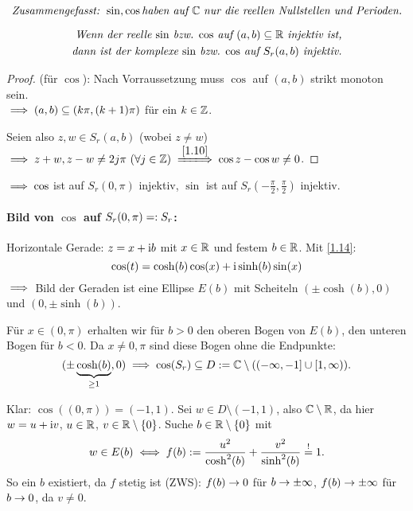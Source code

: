 \documentclass[a4paper,twoside,DIV15,BCOR12mm]{scrbook}
\begin{document}
\vspace*{-10pt}

\begin{equation}\label{1.17}
\text{\it Zusammengefasst: }\sin,\cos \text{\it haben auf }\mathbb{C}\text{ \it nur die reellen Nullstellen und Perioden.}
\end{equation}

\vspace*{-20pt}

\begin{equation}\label{1.18}
\begin{split}
\text{\it Wenn der reelle $\sin$ bzw. $\cos$ auf $(a,b)\subseteq\mathbb{R}$  injektiv ist,}\\\text{\it dann ist der komplexe $\sin$ bzw. $\cos$ auf $S_r(a,b)$ injektiv.}
\end{split}\end{equation}
\begin{proof}
(für $\cos$): Nach Vorraussetzung muss $\cos$ auf $(a,b)$ strikt monoton sein.\\ $\implies (a,b)\subseteq(k\pi,(k+1)\pi)$ für ein $k\in\mathbb{Z}$.

\noindent Seien also $z,w\in S_r(a,b)$ (wobei $z\neq w$) $\folgt z+w, z-w \neq 2j\pi\ (\forall j\in\set{Z})\\ \folgtwegen{\eqref{1.10}}\cos z - \cos w\neq 0$.
\end{proof}

$\implies\cos$ ist auf $S_r(0,\pi)$ injektiv, $\sin$ ist auf $S_r(-\frac{\pi}{2},\frac{\pi}{2})$ injektiv.

\paragraph{Bild von $\cos$ auf $S_r(0,\pi) =: S_r$:} Horizontale Gerade: $z=x+\mathrm{i} b$ mit $x\in\mathbb{R}$ und festem $b\in\mathbb{R}$. Mit \eqref{1.14}:
\[\cos(t) = \cosh(b)\cos(x)+\mathrm{i}\sinh(b)\sin(x)\]
$\implies$ Bild der Geraden ist eine Ellipse $E(b)$ mit Scheiteln $(\pm\cosh(b),0)$ und $(0,\pm\sinh(b))$.

Für $x\in(0,\pi)$ erhalten wir für $b>0$ den oberen Bogen von $E(b)$, den unteren Bogen für $b<0$. Da $x\neq 0,\pi$ sind diese Bogen ohne die Endpunkte:
\[(\pm\underbrace{\cosh(b)}_{\geq 1},0)\implies \cos(S_r)\subseteq D := \mathbb{C}\setminus((-\infty,-1]\cup[1,\infty)).\]

Klar: $\cos((0,\pi)) = (-1,1)$. Sei $w\in D\setminus(-1,1)$, also $\mathbb{C}\setminus\mathbb{R}$, da hier $w = u+\mathrm{i} v$, $u\in\mathbb{R}$, $v\in\mathbb{R}\setminus\{0\}$. Suche $b\in\mathbb{R}\setminus\{0\}$ mit 
\[w\in E(b) \iff f(b) := \frac{u^2}{\cosh^2(b)} + \frac{v^2}{\sinh^2(b)} \stackrel{!}{=} 1.\]
So ein $b$ existiert, da $f$ stetig ist (ZWS): $f(b)\rightarrow 0$ für $b\rightarrow\pm\infty$, $f(b)\rightarrow\pm\infty$ für $b\rightarrow 0$, da $v\neq 0$.
\end{document}
